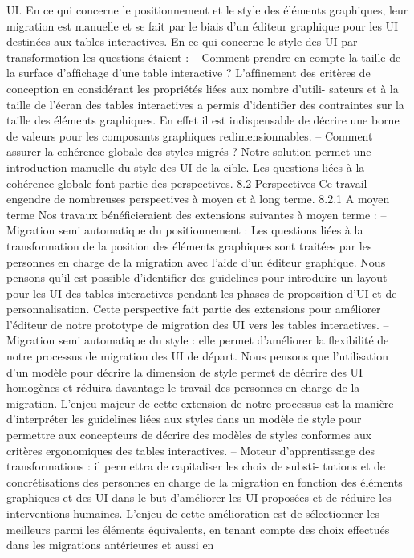 \documentclass{article}
\begin{document}
UI. En ce qui concerne le positionnement et le style des éléments graphiques, leur migration
est manuelle et se fait par le biais d’un éditeur graphique pour les UI destinées aux tables
interactives.
En ce qui concerne le style des UI par transformation les questions étaient :
– Comment prendre en compte la taille de la surface d’afﬁchage d’une table interactive ?
L’afﬁnement des critères de conception en considérant les propriétés liées aux nombre d’utili-
sateurs et à la taille de l’écran des tables interactives a permis d’identiﬁer des contraintes sur
la taille des éléments graphiques. En effet il est indispensable de décrire une borne de valeurs
pour les composants graphiques redimensionnables.
– Comment assurer la cohérence globale des styles migrés ?
Notre solution permet une introduction manuelle du style des UI de la cible. Les questions liées
à la cohérence globale font partie des perspectives.
8.2
Perspectives
Ce travail engendre de nombreuses perspectives à moyen et à long terme.
8.2.1
A moyen terme
Nos travaux bénéﬁcieraient des extensions suivantes à moyen terme :
– Migration semi automatique du positionnement : Les questions liées à la transformation de
la position des éléments graphiques sont traitées par les personnes en charge de la migration
avec l’aide d’un éditeur graphique. Nous pensons qu’il est possible d’identiﬁer des guidelines
pour introduire un layout pour les UI des tables interactives pendant les phases de proposition
d’UI et de personnalisation. Cette perspective fait partie des extensions pour améliorer l’éditeur
de notre prototype de migration des UI vers les tables interactives.
– Migration semi automatique du style : elle permet d’améliorer la ﬂexibilité de notre processus
de migration des UI de départ. Nous pensons que l’utilisation d’un modèle pour décrire la
dimension de style permet de décrire des UI homogènes et réduira davantage le travail des
personnes en charge de la migration. L’enjeu majeur de cette extension de notre processus est la
manière d’interpréter les guidelines liées aux styles dans un modèle de style pour permettre aux
concepteurs de décrire des modèles de styles conformes aux critères ergonomiques des tables
interactives.
– Moteur d’apprentissage des transformations : il permettra de capitaliser les choix de substi-
tutions et de concrétisations des personnes en charge de la migration en fonction des éléments
graphiques et des UI dans le but d’améliorer les UI proposées et de réduire les interventions
humaines. L’enjeu de cette amélioration est de sélectionner les meilleurs parmi les éléments
équivalents, en tenant compte des choix effectués dans les migrations antérieures et aussi en
\end{document}
